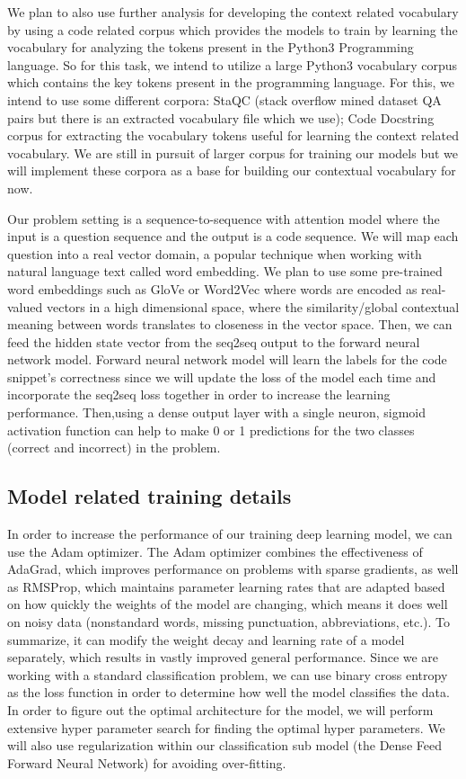 \documentclass[11pt,a4paper]{article}
\begin{document}
We plan to also use further analysis for developing the context
related vocabulary by using a code related corpus which provides the
models to train by learning the vocabulary for analyzing the tokens
present in the Python3 Programming language. So for this task, we
intend to utilize a large Python3 vocabulary corpus which contains the
key tokens present in the programming language. For this, we intend to
use some different corpora: StaQC (stack overflow mined dataset QA
pairs but there is an extracted vocabulary file which we use); Code
Docstring corpus for extracting the vocabulary tokens useful for
learning the context related vocabulary. We are still in pursuit of
larger corpus for training our models but we will implement these
corpora as a base for building our contextual vocabulary for now.

Our problem setting is a sequence-to-sequence with attention model
where the input is a question sequence and the output is a code
sequence. We will map each question into a real vector domain, a
popular technique when working with natural language text called word
embedding. We plan to use some pre-trained word embeddings such as
GloVe or Word2Vec where words are encoded as real-valued vectors in a
high dimensional space, where the similarity/global contextual meaning
between words translates to closeness in the vector space. Then, we
can feed the hidden state vector from the seq2seq output to the
forward neural network model.  Forward neural network model will learn
the labels for the code snippet’s correctness since we will update the
loss of the model each time and incorporate the seq2seq loss together
in order to increase the learning performance. Then,using a dense
output layer with a single neuron, sigmoid activation function can
help to make 0 or 1 predictions for the two classes (correct and
incorrect) in the problem. 

\subsection{Model related training details}
In order to increase the performance of our training deep learning model, we can use the Adam optimizer. The Adam optimizer combines the effectiveness of AdaGrad, which improves performance on problems with sparse gradients, as well as RMSProp, which maintains parameter learning rates that are adapted based on how quickly the weights of the model are changing, which means it does well on noisy data (nonstandard words, missing punctuation, abbreviations, etc.). To summarize, it can modify the weight decay and learning rate of a model separately, which results in vastly improved general performance. Since we are working with a standard classification problem, we can use binary cross entropy as the loss function in order to determine how well the model classifies the data. In order to figure out the optimal architecture for the model, we will perform extensive hyper parameter search for finding the optimal hyper parameters. We will also use regularization within our classification sub model (the Dense Feed Forward Neural Network) for avoiding over-fitting.
\end{document}
